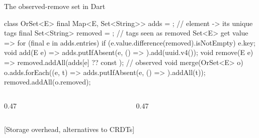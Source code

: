 \documentclass[10pt,aspectratio=169,t]{beamer}
\begin{document}
\begin{frame}[fragile,eyebrow=CRDTs]{The observed-remove set in Dart}
\begin{dart}
class OrSet<E> {
  final Map<E, Set<String>> adds = {};   // element -> its unique tags
  final Set<String> removed = {};        // tags seen as removed
  Set<E> get value => {for (final e in adds.entries)
      if (e.value.difference(removed).isNotEmpty) e.key};
  void add(E e) => adds.putIfAbsent(e, () => {}).add(uuid.v4());
  void remove(E e) => removed.addAll(adds[e] ?? const {});  // observed
  void merge(OrSet<E> o) {
    o.adds.forEach((e, t) => adds.putIfAbsent(e, () => {}).addAll(t));
    removed.addAll(o.removed);}
}
\end{dart}
  \begin{columns}[T]
    \begin{column}{0.47\textwidth}
    \end{column}
    \begin{column}{0.47\textwidth}
    \end{column}
  \end{columns}
\end{frame}

[Storage overhead, alternatives to CRDTs]
\end{document}

